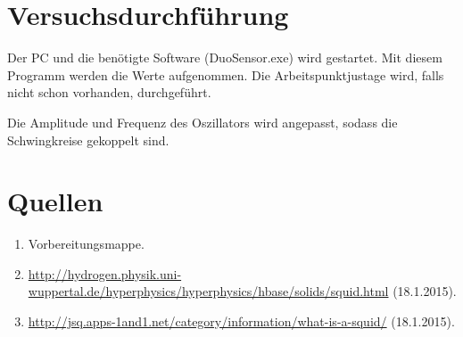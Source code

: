 \documentclass[a4paper,ngerman]{scrartcl}
\begin{document}
\section{Versuchsdurchführung}

Der PC und die benötigte Software (DuoSensor.exe) wird gestartet.
Mit diesem Programm werden die Werte aufgenommen.
Die Arbeitspunktjustage wird, falls nicht schon vorhanden, durchgeführt.

Die Amplitude und Frequenz des Oszillators wird angepasst, sodass die Schwingkreise gekoppelt sind.





\section{Quellen}
\begin{enumerate}
\item Vorbereitungsmappe.\label{ref:mappe}
\item \url{http://hydrogen.physik.uni-wuppertal.de/hyperphysics/hyperphysics/hbase/solids/squid.html} (18.1.2015).\label{ref:wuppertal}
\item \url{http://jsq.apps-1and1.net/category/information/what-is-a-squid/} (18.1.2015).
\label{ref:jsq}
\end{enumerate}
\end{document}
